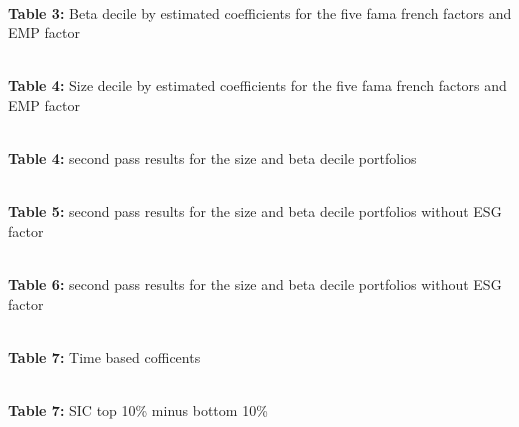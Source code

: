 \documentclass[12pt,oneside,reqno]{amsart}
\begin{document}
\begin{center}
    \paperspacingnarrow
    \\
    \textbf{Table 3:} Beta decile by estimated coefficients for the  five fama french factors and EMP factor\\
    \paperspacingwide
\end{center}


\vspace{1cm}


\begin{center}
    \paperspacingnarrow
    \\
    \textbf{Table 4:} Size decile by estimated coefficients for the  five fama french factors and EMP factor\\
    \paperspacingwide
\end{center}


\begin{center}
    \paperspacingnarrow
    \\
    \textbf{Table 4:} second pass results for the size and beta decile portfolios\\
    \paperspacingwide
\end{center}


\begin{center}
    \paperspacingnarrow
    \\
    \textbf{Table 5:} second pass results for the size and beta decile portfolios without ESG factor\\
    \paperspacingwide
\end{center}


\begin{center}
    \paperspacingnarrow
    \\
    \textbf{Table 6:} second pass results for the size and beta decile portfolios without ESG factor\\
    \paperspacingwide
\end{center}


\begin{center}
    \paperspacingnarrow
    \\
    \textbf{Table 7:} Time based cofficents
    \paperspacingwide
\end{center}

\begin{center}
    \paperspacingnarrow
\\
\textbf{Table 7:} SIC top 10\% minus bottom 10\%
    \paperspacingwide
\end{center}
\clearpage
\restoregeometry


%
\end{document}

